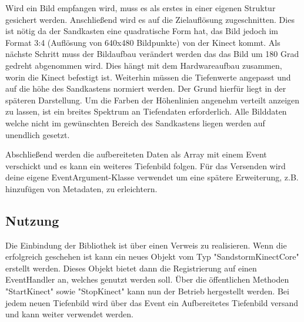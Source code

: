 \begin{Spacing}{\mylinespace}
Wird ein Bild empfangen wird, muss es als erstes in einer eigenen Struktur gesichert werden. Anschließend wird es auf die Zielauflösung zugeschnitten.
Dies ist nötig da der Sandkasten eine quadratische Form hat, das Bild jedoch im Format 3:4 (Auflösung von 640x480 Bildpunkte) von der Kinect kommt.
Als nächste Schritt muss der Bildaufbau verändert werden das das Bild um 180 Grad gedreht abgenommen wird. Dies hängt mit dem Hardwareaufbau zusammen, worin die Kinect befestigt ist. Weiterhin müssen die Tiefenwerte angepasst und auf die höhe des Sandkastens normiert werden. Der Grund hierfür liegt in der späteren Darstellung. Um die Farben der Höhenlinien angenehm verteilt anzeigen zu lassen, ist ein breites Spektrum an Tiefendaten erforderlich. Alle Bilddaten welche nicht im gewünschten Bereich des Sandkastens liegen werden auf unendlich gesetzt.

Abschließend werden die aufbereiteten Daten als Array mit einem Event verschickt und es kann ein weiteres Tiefenbild folgen. Für das Versenden wird deine eigene EventArgument-Klasse verwendet um eine spätere Erweiterung, z.B. hinzufügen von Metadaten, zu erleichtern.

\subsection{Nutzung}

Die Einbindung der Bibliothek ist über einen Verweis zu realisieren. Wenn die erfolgreich geschehen ist kann ein neues Objekt vom Typ "SandstormKinectCore" erstellt werden. Dieses Objekt bietet dann die Registrierung auf einen EventHandler an, welches genutzt werden soll.
Über die öffentlichen Methoden "StartKinect" sowie "StopKinect" kann nun der Betrieb hergestellt werden. Bei jedem neuen Tiefenbild wird über das Event ein Aufbereitetes Tiefenbild versand und kann weiter verwendet werden.

\end{Spacing}
\newpage
\clearpage
